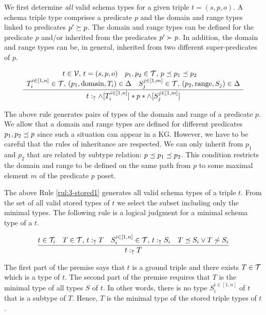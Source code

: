 \documentclass[runningheads]{llncs}
\newcommand{\uarr}{\uparrow}
\newcommand{\V}{{\cal V}}
\newcommand{\T}{{\cal T}}
\begin{document}
We first determine \emph{all} valid schema types for a given triple
$t=(s,p,o)$. A schema triple type comprises a predicate $p$ and the domain and range types
linked to predicates $p'\succeq\/p$. The domain and range types can be
defined for the predicate $p$ and/or inherited from the predicates
$p'\succ\/p$. In addition, the domain and range types can be, in
general, inherited from two different super-predicates of $p$.

\begin{equation}
\label{rul:3-stored1}
\dfrac{\begin{array}{c}
       t\in\V,\, t=(s,p,o)\quad p_1,p_2\in\T,\, p\preceq\/p_1\preceq\/p_2\quad \\
       T_i^{i\in[1,n]}\in\T,\, (p_1,\text{domain},T_i)\in\/\Delta\quad S_j^{j\in[1,m]}\in\T,\, (p_2,\text{range},S_j)\in\Delta
       \end{array}}
      {t:_\uarr\/\land[T_i^{i\in[1,n]}]*p*\land[S_j^{j\in[1,m]}]}
\end{equation}

The above rule generates pairs of types of the domain and range of a
predicate $p$. We allow that a domain and range types are defined for
different predicates $p_1,p_2\preceq\/p$ since such a situation can
appear in a KG. However, we have to be careful that the rules of
inheritance are respected. We can only inherit from $p_1$ and $p_2$
that are related by subtype relation:
$p\preceq\/p_1\preceq\/p_2$. This condition restricts the domain and
range to be defined on the same path from $p$ to some maximal element
$m$ of the predicate $p$ poset. 

The above Rule \ref{rul:3-stored1} generates all valid schema types of
a triple $t$. From the set of all valid stored types of $t$ we select
the subset including only the minimal types. The following rule is a
logical judgment for a minimal schema type of a $t$. 

\begin{equation}
\label{rul:min-stored-type}
\dfrac{t\in\T_i\quad T\in\T,\, t:_\uarr\/T\quad\/S_i^{i\in[1,n]}\in\T,\, t:_\uarr\/S_i\quad T\preceq\/S_i\lor\/T\not\sim\/S_i}
      {t:_{\uarr}\/T}
\end{equation}

The first part of the premise says that $t$ is a ground triple and there
exists $T\in\T$ which is a type of $t$. The second part of the premise
requires that $T$ is the minimal type of all types $S$ of $t$. In
other words, there is no type $S_i^{i\in[1,n]}$ of $t$ that is a
subtype of $T$. Hence, $T$ is the minimal type of the stored triple
types of $t$.
\end{document}
